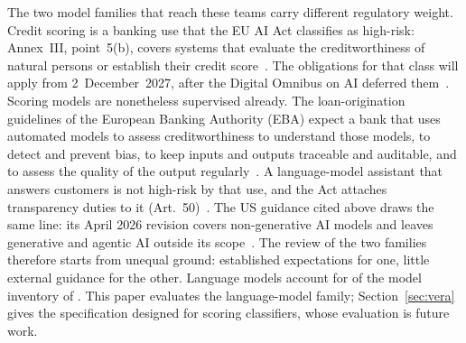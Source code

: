 
The two model families that reach these teams carry different regulatory weight.
Credit scoring is a banking use that the EU AI Act classifies as high-risk: Annex~III, point~5(b), covers systems that evaluate the creditworthiness of natural persons or establish their credit score~\cite{euaiact2024}.
The obligations for that class will apply from 2~December~2027, after the Digital Omnibus on AI deferred them~\cite{euomnibus2026ai}.
Scoring models are nonetheless supervised already.
The loan-origination guidelines of the European Banking Authority (EBA) expect a bank that uses automated models to assess creditworthiness to understand those models, to detect and prevent bias, to keep inputs and outputs traceable and auditable, and to assess the quality of the output regularly~\cite{eba2020loan}.
A language-model assistant that answers customers is not high-risk by that use, and the Act attaches transparency duties to it (Art.~50)~\cite{euaiact2024}.
The US guidance cited above draws the same line: its April 2026 revision covers non-generative AI models and leaves generative and agentic AI outside its scope~\cite{federalreserve2026sr262}.
The review of the two families therefore starts from unequal ground: established expectations for one, little external guidance for the other.
Language models account for  of the model inventory of \bankname{} .
\ifarmwithdrawn
This paper evaluates the language-model family; Section~\ref{sec:vera} gives the specification designed for scoring classifiers, whose evaluation is future work.
\fi

